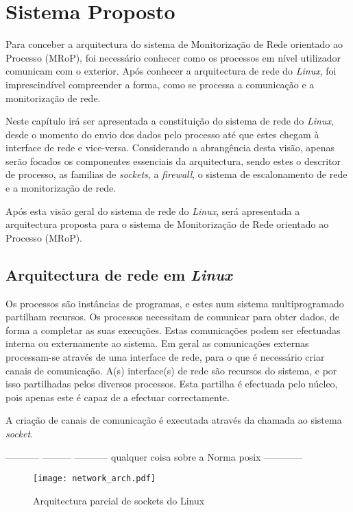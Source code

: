 \chapter{Sistema Proposto}
\label{cap:Estrutura}

Para conceber a arquitectura do sistema de Monitorização de Rede orientado ao Processo (MRoP), foi necessário conhecer como os processos em nível utilizador comunicam com o exterior.
Após conhecer a arquitectura de rede do \textit{Linux}, foi imprescindível compreender a forma, como se processa a comunicação e a monitorização de rede.

Neste capítulo irá ser apresentada a constituição do sistema de rede do \textit{Linux}, desde o momento do envio dos dados pelo processo até que estes chegam à interface de rede e vice-versa.
Considerando a abrangência desta visão, apenas serão focados os componentes essenciais da arquitectura, sendo estes o descritor de processo, as familias de \textit{sockets}, a \textit{firewall}, o sistema de escalonamento de rede e a monitorização de rede.

Após esta visão geral do sistema de rede do \textit{Linux}, será apresentada a arquitectura proposta para o sistema de Monitorização de Rede orientado ao Processo (MRoP).

\section{Arquitectura de rede em \textit{Linux}}
\label{sub:network}

Os processos são instâncias de programas, e estes num sistema multiprogramado partilham recursos.
Os processos necessitam de comunicar para obter dados, de forma a completar as suas execuções.
Estas comunicações podem ser efectuadas interna ou externamente ao sistema.
Em geral as comunicações externas processam-se através de uma interface de rede, para o que é necessário criar canais de comunicação.
A(s) interface(s) de rede são recursos do sistema, e por isso partilhadas pelos diversos processos.
Esta partilha é efectuada pelo núcleo, pois apenas este é capaz de a efectuar correctamente.

A criação de canais de comunicação é executada através da chamada ao sistema \textit{socket}.

----------- --------- ----------- qualquer coisa sobre a Norma posix ------------

\begin{figure}[htbp]
\centering
\texttt{[image: network\_arch.pdf]} 
\caption{Arquitectura parcial de sockets do Linux}
\label{fig:network_arch}
\end{figure}

